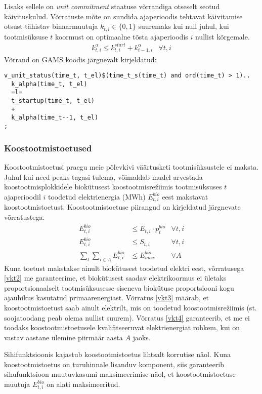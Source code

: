 \documentclass[10pt,a4paper]{article}
\begin{document}
Lisaks sellele on \emph{unit commitment} staatuse võrrandiga otseselt seotud käivitus\-kulud. Võrratuste mõte on sundida ajaperioodis tehtavat käivita\-mise otsust tähistav binaarmuutuja $k_{t,i} \in \{0,1\}$ suuremaks kui null juhul, kui tootmisüksuse $t$ koormust on optimaalne tõsta ajaperioodis $i$ nullist kõrgemale.
\begin{align}
k^\alpha_{t,i} \leq k^{start}_{t,i} + k^\alpha_{t-1,i} &\forall t,i
\end{align}
Võrrand on GAMS koodis järgnevalt kirjeldatud:
\begin{verbatim}
v_unit_status(time_t, t_el)$(time_t_s(time_t) and ord(time_t) > 1)..
  k_alpha(time_t, t_el)
  =l=
  t_startup(time_t, t_el)
  +
  k_alpha(time_t--1, t_el)
;
\end{verbatim}

\subsubsection{Koostootmistoetused}
Koostootmistoetusi praegu meie põlevkivi väärtusketi tootmisüksustele ei maksta. Juhul kui need peaks tagasi tulema, võimaldab mudel arvestada koostootmisplokkidele biokütusest koostootmisrežiimis tootmisüksuses $t$ ajaperioodil $i$ toodetud elektrienergia (MWh) $E^{bio}_{t,i}$ eest makstavat koostootmistoetust. Koostootmistoetuse piirangud on kirjeldatud järgnevate võrratustega.
\begin{align}
E^{bio}_{t,i} &\leq E_{t,i} \cdot p^{bio}_{t} & \forall t,i \label{vkt2} \\
E^{bio}_{t,i} &\leq S_{t,i} & \forall t,i \label{vkt3} \\
\sum_t \sum_{i \in A} E^{bio}_{t,i} &\leq E^{bio}_{max} & \forall A \label{vkt4}
\end{align}
Kuna toetust makstakse ainult biokütusest toodetud elektri eest, võrratusega \eqref{vkt2} me garanteerime, et biokütusest saadav elektrikoormus ei ületaks proportsionaalselt tootmisüksusesse siseneva biokütuse proportsiooni kogu ajaühikus kasutatud primaarenergiast.
Võrratus \eqref{vkt3} määrab, et koostootmistoetust saab ainult elektrilt, mis on toodetud koostootmisrežiimis (st. soojatoodang peab olema nullist suurem).
Võrratus \eqref{vkt4} garanteerib, et me ei toodaks koostootmistoetusele kvalifitseeruvat elektrienergiat rohkem, kui on vastav aastane ülemine piirmäär aasta $A$ jaoks.

Sihifunktsioonis kajastub koostootmistoetus lihtsalt korrutise näol. Kuna koostootmistoetus on turuhinnale lisanduv komponent, siis garanteerib sihufunktsioon muutuvkasumi maksimeerimise näol, et koostootmistoetuse muutuja $E^{bio}_{t,i}$ on alati maksimeeritud.
\end{document}
